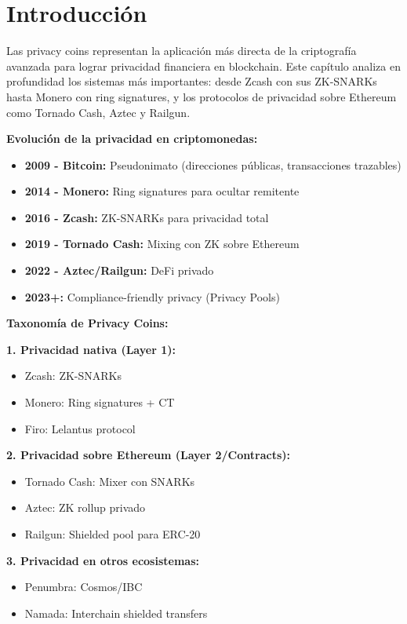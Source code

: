 \documentclass[11pt,a4paper,twoside]{book}
\begin{document}
\section*{Introducci\'on}

Las privacy coins representan la aplicaci\'on m\'as directa de la criptograf\'ia avanzada para lograr privacidad financiera en blockchain. Este cap\'itulo analiza en profundidad los sistemas m\'as importantes: desde Zcash con sus ZK-SNARKs hasta Monero con ring signatures, y los protocolos de privacidad sobre Ethereum como Tornado Cash, Aztec y Railgun.

\begin{keyidea}
\textbf{Evoluci\'on de la privacidad en criptomonedas:}
\begin{itemize}
    \item \textbf{2009 - Bitcoin:} Pseudonimato (direcciones p\'ublicas, transacciones trazables)
    \item \textbf{2014 - Monero:} Ring signatures para ocultar remitente
    \item \textbf{2016 - Zcash:} ZK-SNARKs para privacidad total
    \item \textbf{2019 - Tornado Cash:} Mixing con ZK sobre Ethereum
    \item \textbf{2022 - Aztec/Railgun:} DeFi privado
    \item \textbf{2023+:} Compliance-friendly privacy (Privacy Pools)
\end{itemize}
\end{keyidea}

\begin{mathnote}
\textbf{Taxonom\'ia de Privacy Coins:}

\textbf{1. Privacidad nativa (Layer 1):}
\begin{itemize}
    \item Zcash: ZK-SNARKs
    \item Monero: Ring signatures + CT
    \item Firo: Lelantus protocol
\end{itemize}

\textbf{2. Privacidad sobre Ethereum (Layer 2/Contracts):}
\begin{itemize}
    \item Tornado Cash: Mixer con SNARKs
    \item Aztec: ZK rollup privado
    \item Railgun: Shielded pool para ERC-20
\end{itemize}

\textbf{3. Privacidad en otros ecosistemas:}
\begin{itemize}
    \item Penumbra: Cosmos/IBC
    \item Namada: Interchain shielded transfers
\end{itemize}
\end{mathnote}
\end{document}
